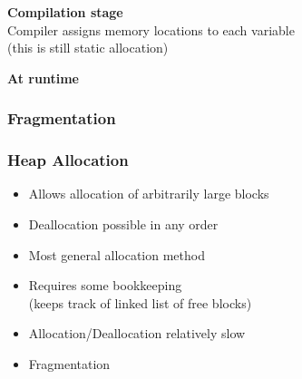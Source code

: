 \documentclass{../ucll-slides}
\newenvironment{procontralist}{
  \begingroup
  \newcommand{\pro}{\item[\Checkmark]}
  \newcommand{\con}{\item[\XSolidBrush]}
  \begin{itemize}
  }{
  \end{itemize}
  \endgroup}
\begin{document}
\begin{frame}
\begin{columns}
\begin{center}
    \end{center}
  \end{columns}
  \vskip2cm
  \begin{overprint}
    \begin{center}
      \textbf{Compilation stage} \\ Compiler assigns memory locations to each variable \\ (this is still static allocation)
    \end{center}

    \begin{center}
      \textbf{At runtime}
    \end{center}
  \end{overprint}
\end{frame}

\begin{frame}
  \frametitle{Fragmentation}
  \begin{center}
  \end{center}
\end{frame}

\begin{frame}
  \frametitle{Heap Allocation}
  \begin{procontralist}
    \pro Allows allocation of arbitrarily large blocks
    \pro Deallocation possible in any order
    \pro Most general allocation method
    \con Requires some bookkeeping \\ (keeps track of linked list of free blocks)
    \con Allocation/Deallocation relatively slow
    \con Fragmentation
  \end{procontralist}
\end{frame}



\end{document}
